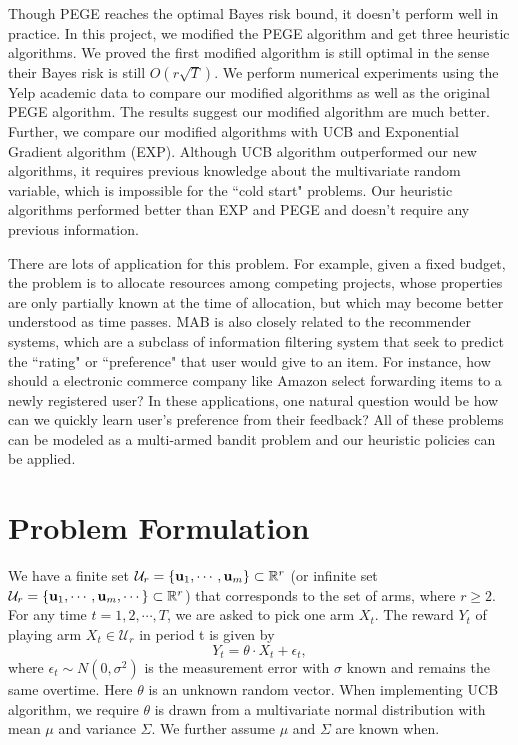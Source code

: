 \documentclass{article}
\theoremstyle{plain}
\theoremstyle{definition}
\begin{document}
Though PEGE reaches the optimal Bayes risk bound, it doesn't perform well in practice. In this project, we modified the PEGE algorithm and get three heuristic algorithms. We proved the first modified algorithm is still optimal in the sense their Bayes risk is still $O(r\sqrt{T})$. We perform numerical experiments using the Yelp academic data to compare our modified algorithms as well as the original PEGE algorithm. The results suggest our modified algorithm are much better. Further, we compare our modified algorithms with UCB and Exponential Gradient algorithm (EXP). Although UCB algorithm outperformed our new algorithms, it requires previous knowledge about the multivariate random variable, which is impossible for the ``cold start" problems. Our heuristic algorithms performed better than EXP and PEGE and doesn't require any previous information.

There are lots of application for this problem. For example, given a fixed budget, the problem is to allocate resources among competing projects, whose properties are only partially known at the time of allocation, but which may become better understood as time passes. MAB is also closely related to the recommender systems, which are a subclass of information filtering system that seek to predict the ``rating" or ``preference" that user would give to an item. For instance, how should a electronic commerce company like Amazon select forwarding items to a newly registered user? In these applications, one natural question would be how can we quickly learn user's preference from their feedback? All of these problems can be modeled as a multi-armed bandit problem and our heuristic policies can be applied.





\section{Problem Formulation}
We have a finite set $\mathcal{U}_{r}=\{\bold{u}_{1},\cdots,\bold{u}_{m}\}\subset \mathbb{R}^{r}$ (or infinite set $\mathcal{U}_{r}=\{\bold{u}_{1},\cdots,\bold{u}_{m},\cdots\}\subset \mathbb{R}^{r}$) that corresponds to the set of arms, where $r\geq 2$. For any time $t=1,2,\cdots,T$, we are asked to pick one arm $X_{t}$. The reward $Y_{t}$ of playing arm $X_{t}\in \mathcal{U}_{r}$ in period t is given by
\begin{equation}
Y_{t} = \theta \cdot X_{t} + \epsilon_{t}, \nonumber
\end{equation}
where $\epsilon_{t}\sim N(0,\sigma^{2})$ is the measurement error with $\sigma$ known and remains the same overtime. Here $\theta$ is an unknown random vector. When implementing UCB algorithm, we require $\theta$ is drawn from a multivariate normal distribution with mean $\mu$ and variance $\Sigma$. We further assume $\mu$ and $\Sigma$ are known when. 
\end{document}
